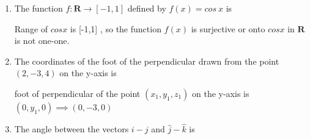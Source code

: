 \begin{enumerate}[label=\thesubsection.\arabic*, ref=\thesubsection.\theenumi]
3 points of discontinuity

\item 
The function $f:\mathbf{R}\rightarrow[-1,1]$ defined by $f(x)=cos~x$ is
\begin{enumerate}
\end{enumerate}

\solution 

Range of $cosx$ is [-1,1] , so the function $f(x)$ is surjective or onto
$cosx $ in $\mathbf{R}$ is not one-one.

\item 

The coordinates of the foot of the perpendicular drawn from the point $(2,-3,4)$ on the y-axis is
\begin{enumerate}
\end{enumerate}
\solution 

foot of perpendicular of the point  $(x_1,y_1,z_1)$ on the y-axis is $(0,y_1,0) \implies (0,-3,0)$



\item 

The angle between the vectors $i-j$ and $\hat{j}-\hat{k}$ is
\begin{enumerate}
\end{enumerate}
\end{enumerate}
